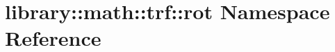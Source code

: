 \hypertarget{namespacelibrary_1_1math_1_1trf_1_1rot}{}\section{library\+:\+:math\+:\+:trf\+:\+:rot Namespace Reference}
\label{namespacelibrary_1_1math_1_1trf_1_1rot}
